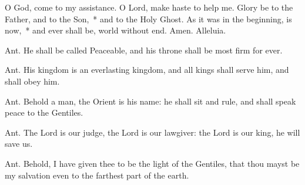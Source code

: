 \documentclass[12pt]{book}
\begin{document}
 
 \twosided[pc] %
 
  \thispagestyle{empty}
 
 {\par}
 


\noindent
\begin{enpars}
O God, \cc{} come to my assistance. \rr O Lord, make haste to help me. Glory be to the Father, and to the Son,~* and to the Holy Ghost. As it was in the beginning, is now,~* and ever shall be, world without end. Amen. Alleluia.\end{enpars}

 \begin{enpars} \noindent Ant. He shall be called Peaceable, and his throne shall be most firm for ever. \end{enpars}


%

%
% 
 \begin{enpars} \noindent Ant. His kingdom is an everlasting kingdom, and all kings shall serve him, and shall obey him. \end{enpars}
%
%

  \begin{enpars} \noindent Ant. Behold a man, the Orient is his name: he shall sit and rule, and shall speak peace to the Gentiles. \end{enpars}
%
%
%
\begin{enpars} \noindent Ant. The Lord is our judge, the Lord is our lawgiver: the Lord is our king, he will save us. \end{enpars}
%
%
% 
\begin{enpars} \noindent Ant. Behold, I have given thee to be the light of the Gentiles, that thou mayst be my salvation even to the farthest part of the earth. \end{enpars}
%
\end{document}
